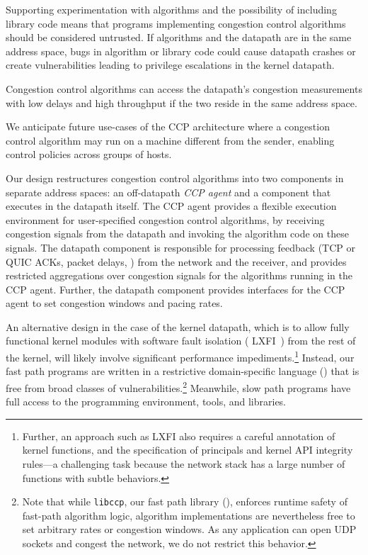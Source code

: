 Supporting experimentation with algorithms and the possibility of
including \userspace library code means that programs implementing congestion
control algorithms should be considered untrusted. If algorithms and the
datapath are in the same address space, bugs in algorithm or library code could
cause datapath crashes or create vulnerabilities leading to privilege
escalations in the kernel datapath.

 Congestion control algorithms can access the datapath's
congestion measurements with low delays and high throughput if the two reside in
the same address space.

 We anticipate future use-cases of the CCP architecture where
a congestion control algorithm may run on a machine different from the sender,
enabling control policies across groups of hosts.

Our design restructures congestion control algorithms into two components in
separate address spaces: an off-datapath {\em CCP agent} and a component that
executes in the datapath itself.
%
The CCP agent provides a flexible execution environment for user-specified
congestion control algorithms, by receiving congestion signals from the datapath
and invoking the algorithm code on these signals.
%
The datapath component is responsible for processing feedback (\eg TCP or QUIC
ACKs, packet delays, \etc) from the network and the receiver, and provides
restricted aggregations over congestion signals for the algorithms running in
the CCP agent.
%
Further, the datapath component provides interfaces for the CCP agent to set
congestion windows and pacing rates.

An alternative design in the case of the kernel datapath, which is to allow
fully functional kernel modules with software fault isolation (\eg
LXFI~\cite{lxfi}) from the rest of the kernel, will likely involve significant
performance impediments.\footnote{Further, an approach such as LXFI also
  requires a careful annotation of kernel functions, and the specification of
  principals and kernel API integrity rules---a challenging task because the
  network stack has a large number of functions with subtle behaviors.}
%
Instead, our fast path programs are written in a restrictive domain-specific language ()
that is free from broad classes of vulnerabilities.\footnote{Note that while \texttt{libccp}, our fast path library (), enforces runtime safety of fast-path algorithm logic,
algorithm implementations are nevertheless free to set arbitrary rates or congestion windows.
As any application can open UDP sockets and congest the network, we do not restrict this behavior.}
Meanwhile, slow path programs have full access to the \userspace programming environment,
tools, and libraries.

